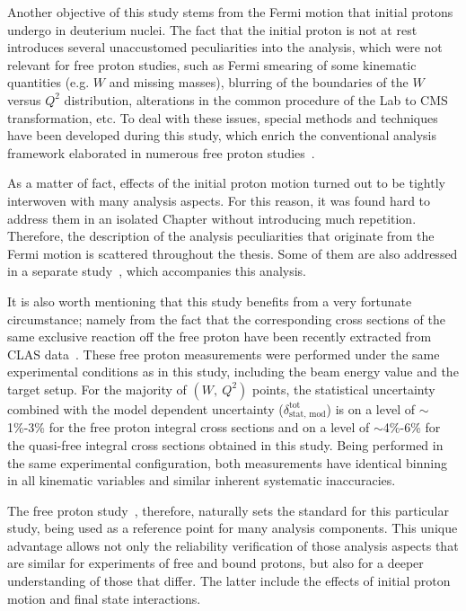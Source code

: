 Another objective of this study stems from the Fermi motion that initial protons undergo in deuterium nuclei. The fact that the initial proton is not at rest introduces several unaccustomed peculiarities into the analysis, which were not relevant for free proton studies, such as Fermi smearing of some kinematic quantities (e.g. $W$ and missing masses), blurring of the boundaries of the $W$ versus $Q^{2}$ distribution, alterations in the common procedure of the Lab to CMS transformation, etc. To deal with these issues, special methods and techniques have been developed during this study, which enrich the conventional analysis framework elaborated in numerous free proton studies~\cite{Rip_an_note:2002,Ripani:2002ss,Fed_an_note:2007,Fedotov:2008aa,Isupov:2017lnd,Golovach,Arjun,Fed_an_note:2017,Fed_paper_2018}.


As a matter of fact, effects of the initial proton motion turned out to be tightly interwoven with many analysis aspects. For this reason, it was found hard to address them in an isolated Chapter without introducing much repetition. Therefore, the description of the analysis peculiarities that originate from the Fermi motion is scattered throughout the thesis. Some of them are also addressed in a separate study~\cite{twopeg-d}, which accompanies this analysis.  



It is also worth mentioning that this study benefits from a very fortunate circumstance; namely from the fact that the corresponding cross sections of the same exclusive reaction off the free proton have been recently extracted from CLAS data~\cite{Fed_an_note:2017,Fed_paper_2018}. These free proton measurements were performed under the same experimental conditions as in this study, including the beam energy value and the target setup. For the majority of $(W,~Q^{2})$ points, the statistical uncertainty combined with the model dependent uncertainty ($\delta_{\text{stat,~mod}}^{\text{tot}}$) is on a level of $\sim$1\%-3\% for the free proton integral cross sections and on a level of $\sim$4\%-6\% for the quasi-free integral cross sections obtained in this study. Being performed in the same experimental configuration, both measurements have identical binning in all kinematic variables and similar inherent systematic inaccuracies. 

The free proton study~\cite{Fed_an_note:2017,Fed_paper_2018}, therefore, naturally sets the standard for this particular study, being used as a reference point for many analysis components. This unique advantage allows not only the reliability verification of those analysis aspects that are similar for experiments of free and bound protons, but also for a deeper understanding of those that differ. The latter include the effects of initial proton motion and final state interactions.



